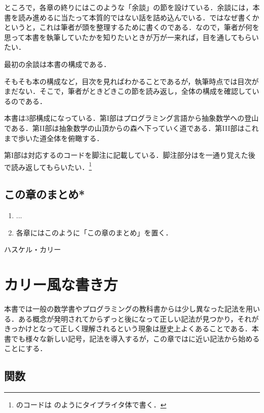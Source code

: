 \documentclass[a5paper,twoside,fleqn,draft]{jsbook}
\begin{document}
ところで，各章の終りにはこのような「余談」の節を設けている．余談には，本書を読み進めるに当たって本質的ではない話を詰め込んでいる．ではなぜ書くかというと，これは筆者が頭を整理するために書くのである．なので，筆者が何を思って本書を執筆していたかを知りたいときが万が一来れば，目を通してもらいたい．

最初の余談は本書の構成である．

そもそも本の構成など，目次を見ればわかることであるが，執筆時点では目次がまだない．そこで，筆者がときどきこの節を読み返し，全体の構成を確認しているのである．

本書は3部構成になっている．第I部はプログラミング言語から抽象数学への登山である．第II部は抽象数学の山頂から\haskell の森へ下っていく道である．第III部はこれまで歩いた道全体を俯瞰する．

第I部は対応する\haskell のコードを脚注に記載している．脚注部分は\haskell を一通り覚えた後で読み返してもらいたい．\footnote{\haskell のコードは  のようにタイプライタ体で書く．}

\section{この章のまとめ*}

\begin{enumerate}
\item ...  \item 各章にはこのように「この章のまとめ」を置く．
\end{enumerate}

\begin{note}{ハスケル・カリー}
\end{note}

\chapter{カリー風な書き方}
\label{ch:curry}

\begin{leader}
本書では一般の数学書やプログラミングの教科書からは少し異なった記法を用いる．ある概念が発明されてからずっと後になって正しい記法が見つかり，それがきっかけとなって正しく理解されるという現象は歴史上よくあることである．本書でも様々な新しい記号，記法を導入するが，この章では\haskell に近い記法から始めることにする．
\end{leader}

\section{関数}
\end{document}

